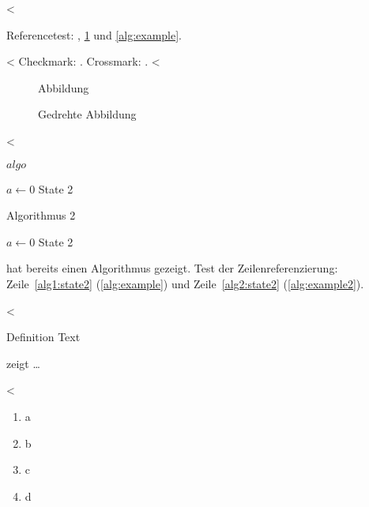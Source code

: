 <%
\label{ssec:example}

Referencetest: , \cref{fig:Abbildung} und \cref{alg:example}.

<%
Checkmark: \dingcheck. Crossmark: \dingcross.
<%

\begin{figure}
  \missingfigure{}
  \caption{Abbildung}
  \label{fig:Abbildung}
\end{figure}

\begin{landscape}
  \begin{figure}
    \missingfigure{}
    \caption{Gedrehte Abbildung}
    \label{fig:AbbildungGedreht}
  \end{figure}
\end{landscape}

<%

\begin{algorithm}
  \caption{$algo$}
  \label{alg:example}
  \begin{algorithmic}[1]
    \State $a \gets 0$
    \State State 2\label{alg1:state2}
  \end{algorithmic}
\end{algorithm}

\begin{algorithm}
\caption{Algorithmus 2}
\label{alg:example2}
\begin{algorithmic}[1]
\State $a \gets 0$
\State State 2\label{alg2:state2}
\end{algorithmic}
\end{algorithm}

 hat bereits einen Algorithmus gezeigt.
Test der Zeilenreferenzierung: Zeile~\ref{alg1:state2} (\cref{alg:example}) und Zeile~\ref{alg2:state2} (\cref{alg:example2}).

<%
\begin{definition}[Title]
\label{def:def1}
Definition Text
\end{definition}

 zeigt \ldots

<%

\begin{enumerate}[label=\alph*)]
\item a
\item b
\item c
\item d
\end{enumerate}

